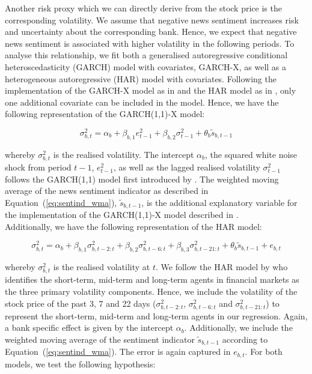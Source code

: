 Another risk proxy which we can directly derive from the stock price is the corresponding volatility. We assume that negative news sentiment increases risk and uncertainty about the corresponding bank. Hence, we expect that negative news sentiment is associated with higher volatility in the following periods. To analyse this relationship, we fit both a generalised autoregressive conditional heteroscedasticity (GARCH) model with covariates, GARCH-X, as well as a heterogeneous autoregressive (HAR) model with covariates. Following the implementation of the GARCH-X model as in \cite{sucarrat2021} and the HAR model as in \cite{boudt2022}, only one additional covariate can be included in the model. Hence, we have the following representation of the GARCH(1,1)-X model: 

\begin{equation}
	\sigma^2_{b,t} = \alpha_b + \beta_{b,1}e^2_{t-1} + \beta_{b,2}\sigma^2_{t-1} + \theta_b\tilde{s}_{b,t-1}
\end{equation}

whereby $\sigma^2_{b,t}$ is the realised volatility. The intercept $\alpha_b$, the squared white noise shock from period $t-1$, $e^2_{t-1}$, as well as the lagged realised volatility $\sigma^2_{t-1}$ follows the GARCH(1,1) model first introduced by \cite{bollerslev1986}.  The weighted moving average of the news sentiment indicator as described in \mbox{Equation~(\ref{eq:sentind_wma})}, $\tilde{s}_{b,t-1}$, is the additional explanatory variable for the implementation of the GARCH(1,1)-X model described in \cite{sucarrat2021}. \\

Additionally, we have the following representation of the HAR model:

\begin{equation}
	\sigma^2_{b,t} = \alpha_b + \beta_{b,1}\sigma^2_{b,t-2:t} + \beta_{b,2}\sigma^2_{b,t-6:t} + \beta_{b,3}\sigma^2_{b,t-21:t} + \theta_b \tilde{s}_{b,t-1} + e_{b,t}
\end{equation}

whereby $\sigma^2_{b,t}$ is the realised volatility at $t$. We follow the HAR model by \cite{corsi2009} who identifies the short-term, mid-term and long-term agents in financial markets as the three primary volatility components. Hence, we include the volatility of the stock price of the past 3, 7 and 22 days ($\sigma^2_{b,t-2:t}$, $\sigma^2_{b,t-6:t}$ and $\sigma^2_{b,t-21:t}$) to represent the short-term, mid-term and long-term agents in our regression. Again, a bank specific effect is given by the intercept $\alpha_b$. Additionally, we include the weighted moving average of the sentiment indicator $\tilde{s}_{b,t-1}$ according to \mbox{Equation~(\ref{eq:sentind_wma})}. The error is again captured in $e_{b,t}$. For both models, we test the following hypothesis:

